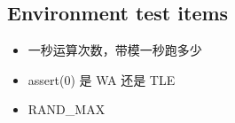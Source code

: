 \subsection{Environment test items}

\begin{itemize}
    \item 一秒运算次数，带模一秒跑多少
    \item assert(0) 是 WA 还是 TLE
    \item RAND\_MAX
\end{itemize}
